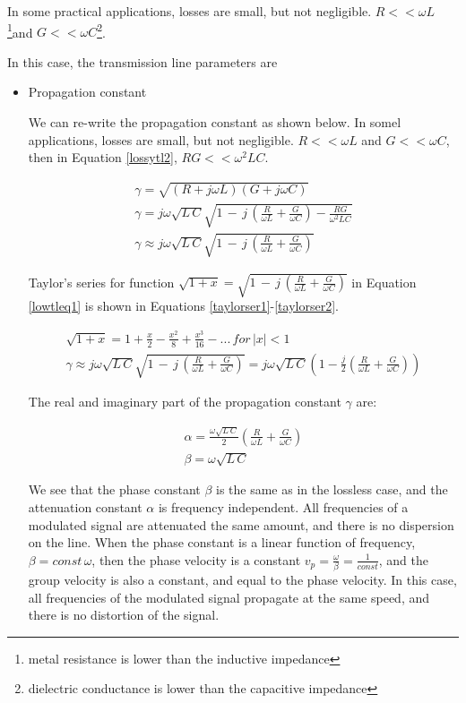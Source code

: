 \documentclass{ximera}
\begin{document}
In some practical applications, losses are small, but not negligible.  $R<< \omega L$ \footnote{metal resistance is
lower than the inductive impedance}and $G <<  \omega C$\footnote{dielectric conductance is lower than the capacitive impedance}. 

In this case, the transmission line parameters are
\begin{itemize}
\item Propagation constant

We can re-write the propagation constant as shown below. 
In somel applications,  losses are small, but not negligible.  $R<< \omega L$ and $G <<  \omega C$, then
in Equation \ref{lossytl2}, $ RG<< \omega^2 LC$.

\begin{eqnarray}
\gamma =\sqrt{(R+j\omega L)(G+ j\omega C)}   \\ 
\gamma= j\omega \sqrt{ L\, C}\sqrt{1\,-\,j\,\left( \frac{R}{\omega L}+\frac{G}{\omega C} \right)-\frac{R G}{\omega^2  L  C}} \label{lossytl2} \\ 
\gamma\approx j\omega \sqrt{ L\, C}\sqrt{1\,-\,j\,\left( \frac{R}{\omega L}+\frac{G}{\omega C} \right)}\label{lowtleq1}
\end{eqnarray}

Taylor's series for function $\sqrt{1+x}= \sqrt{1\,-\,j\,\left( \frac{R}{\omega L}+\frac{G}{\omega C} \right)}$ in Equation \ref{lowtleq1} is shown in Equations \ref{taylorser1}-\ref{taylorser2}.

\begin{eqnarray}
\sqrt{1+x}=1+\frac{x}{2}-\frac{x^2}{8}+\frac{x^3}{16}-...  \,for\, |x|<1 \label{taylorser1} \\
\gamma \approx  j\omega \sqrt{ L\, C} \sqrt{1\,-\,j\,\left( \frac{R}{\omega L}+\frac{G}{\omega C} \right)}= j\omega \sqrt{ L\, C}\left(1-\frac{j}{2} \left(  \frac{R}{\omega L}+\frac{G}{\omega C} \right)\right) \label{taylorser2}
\end{eqnarray}


The real and imaginary part of the propagation constant  $\gamma$ are:

\begin{eqnarray}
\alpha=  \frac{   \omega \sqrt{ L\, C}  }{2} \left(  \frac{R}{\omega L}+\frac{G}{\omega C} \right)  \\
\beta=     \omega \sqrt{ L\, C}
\end{eqnarray}


We see that the phase constant $\beta$ is the same as in the lossless case, and the attenuation constant $\alpha$ is frequency independent. All frequencies of a modulated signal are attenuated the same amount, and there is no dispersion on the line. When the phase constant is a linear function of frequency, $\beta=const \, \omega$, then the phase velocity is a constant $v_p=\frac{\omega}{\beta}=\frac{1}{const}$, and the group velocity is also a constant, and equal to the phase velocity. In this case, all frequencies of the modulated signal propagate at the same speed, and there is no distortion of the signal. 


\end{itemize}
\end{document}

